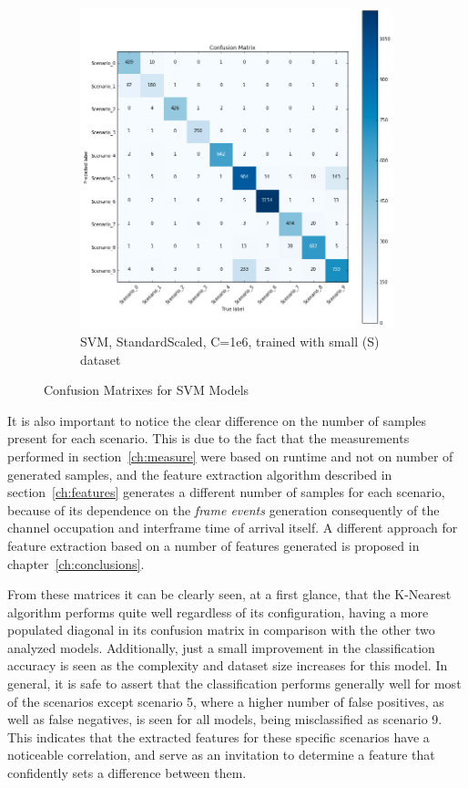 \begin{figure}[!htb]
\begin{subfigure}[htb]{0.49\textwidth}
        \includegraphics[width=\linewidth]{figures/svc_scaled_S_1e6}
        \caption{\ac{SVM}, StandardScaled, C=1e6, trained with small (S) dataset}
        \label{fig:knn_4}
    \end{subfigure}
    \caption{Confusion Matrixes for \ac{SVM} Models}
    \label{fig:confusionsvc}
\end{figure}
It is also important to notice the clear difference on the number of samples present for each scenario. This is due to the fact that the measurements performed in section~\ref{ch:measure} were based on runtime and not on number of generated samples, and the feature extraction algorithm described in section~\ref{ch:features} generates a different number of samples for each scenario, because of its dependence on the \emph{frame events} generation consequently of the channel occupation and interframe time of arrival itself. A different approach for feature extraction based on a number of features generated is proposed in chapter~\ref{ch:conclusions}.

From these matrices it can be clearly seen, at a first glance, that the K-Nearest algorithm performs quite well regardless of its configuration, having a more populated diagonal in its confusion matrix in comparison with the other two analyzed models. Additionally, just a small improvement in the classification accuracy is seen as the complexity and dataset size increases for this model. In general, it is safe to assert that the classification performs generally well for most of the scenarios except scenario 5, where a higher number of false positives, as well as false negatives, is seen for all models, being misclassified as scenario 9. This indicates that the extracted features for these specific scenarios have a noticeable correlation, and serve as an invitation to determine a feature that confidently sets a difference between them.
